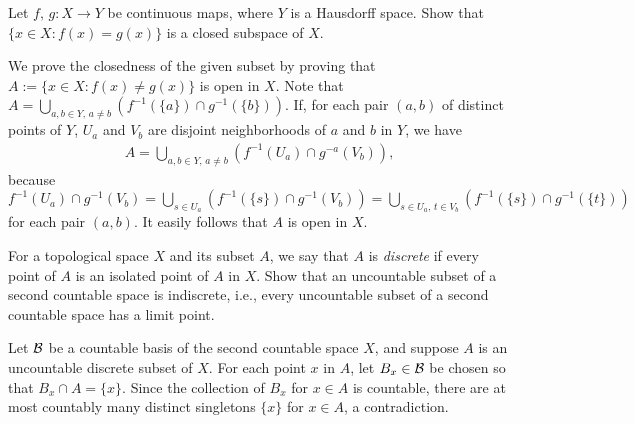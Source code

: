 \begin{prob}
    Let $f,\,g: X\rightarrow Y$ be continuous maps, where $Y$ is a Hausdorff space.
    Show that $\{x\in X: f(x)=g(x)\}$ is a closed subspace of $X$.
\end{prob}
\begin{sol}
    We prove the closedness of the given subset by proving that $A:=\{x\in X: f(x)\neq g(x)\}$ is open in $X$.
    Note that $A=\bigcup_{a, b\in Y,\, a\neq b}(f^{-1}(\{a\})\cap g^{-1}(\{b\}))$.
    If, for each pair $(a, b)$ of distinct points of $Y$, $U_a$ and $V_b$ are disjoint neighborhoods of $a$ and $b$ in $Y$, we have
    \begin{align*}
        A=\bigcup_{a, b\in Y,\, a\neq b} (f^{-1}(U_a)\cap g^{-a}(V_b)),
    \end{align*}
    because $f^{-1}(U_a)\cap g^{-1}(V_b)=\bigcup_{s\in U_a}\left(f^{-1}(\{s\})\cap g^{-1}(V_b)\right)=\bigcup_{s\in U_a,\, t\in V_b}(f^{-1}(\{s\})\cap g^{-1}(\{t\}))$ for each pair $(a, b)$.
    It easily follows that $A$ is open in $X$.
\end{sol}

\begin{prob}
    For a topological space $X$ and its subset $A$, we say that $A$ is \textit{discrete} if every point of $A$ is an isolated point of $A$ in $X$.
    Show that an uncountable subset of a second countable space is indiscrete, i.e., every uncountable subset of a second countable space has a limit point.
\end{prob}
\begin{sol}
    Let ${\mathcal{B}}$ be a countable basis of the second countable space $X$, and suppose $A$ is an uncountable discrete subset of $X$.
    For each point $x$ in $A$, let $B_x\in{\mathcal{B}}$ be chosen so that $B_x\cap A=\{x\}$.
    Since the collection of $B_x$ for $x\in A$ is countable, there are at most countably many distinct singletons $\{x\}$ for $x\in A$, a contradiction.
\end{sol}